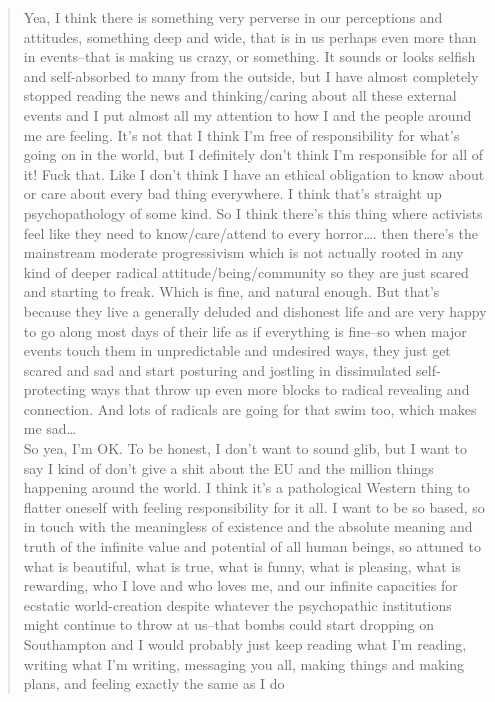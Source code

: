 \documentclass[a4paper,12pt,margin=.5in]{article}
\begin{document}
\begin{quote}
Yea, I think there is something very perverse in our perceptions and
attitudes, something deep and wide, that is in us perhaps even more than
in events--that is making us crazy, or something. It sounds or looks
selfish and self-absorbed to many from the outside, but I have almost
completely stopped reading the news and thinking/caring about all these
external events and I put almost all my attention to how I and the
people around me are feeling. It's not that I think I'm free of
responsibility for what's going on in the world, but I definitely don't
think I'm responsible for all of it! Fuck that. Like I don't think I
have an ethical obligation to know about or care about every bad thing
everywhere. I think that's straight up psychopathology of some kind. So
I think there's this thing where activists feel like they need to
know/care/attend to every horror\ldots{}. then there's the mainstream
moderate progressivism which is not actually rooted in any kind of
deeper radical attitude/being/community so they are just scared and
starting to freak. Which is fine, and natural enough. But that's because
they live a generally deluded and dishonest life and are very happy to
go along most days of their life as if everything is fine--so when major
events touch them in unpredictable and undesired ways, they just get
scared and sad and start posturing and jostling in dissimulated
self-protecting ways that throw up even more blocks to radical revealing
and connection. And lots of radicals are going for that swim too, which
makes me sad\ldots{}\\
\hspace*{0.333em} So yea, I'm OK. To be honest, I don't want to sound
glib, but I want to say I kind of don't give a shit about the EU and the
million things happening around the world. I think it's a pathological
Western thing to flatter oneself with feeling responsibility for it all.
I want to be so based, so in touch with the meaningless of existence and
the absolute meaning and truth of the infinite value and potential of
all human beings, so attuned to what is beautiful, what is true, what is
funny, what is pleasing, what is rewarding, who I love and who loves me,
and our infinite capacities for ecstatic world-creation despite whatever
the psychopathic institutions might continue to throw at us--that bombs
could start dropping on Southampton and I would probably just keep
reading what I'm reading, writing what I'm writing, messaging you all,
making things and making plans, and feeling exactly the same as I do

\end{quote}
\end{document}
